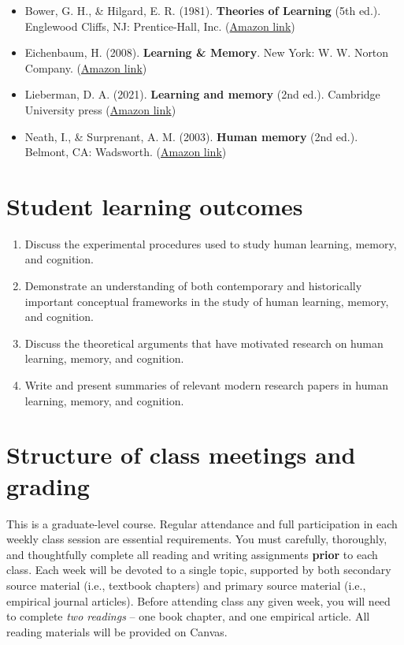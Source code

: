 \documentclass[10pt]{article}
\begin{document}
\begin{itemize}
\item Bower, G. H., \& Hilgard, E. R. (1981). \textbf{Theories of Learning} (5th ed.). Englewood Cliffs, NJ: Prentice-Hall, Inc. (\href{https://www.amazon.com/Theories-Learning-5th-Gordon-Bower/dp/0139144323}{Amazon link})
\item Eichenbaum, H. (2008). \textbf{Learning \& Memory}. New York: W. W. Norton Company. (\href{https://www.amazon.com/Learning-Memory-Howard-Eichenbaum/dp/0393924475}{Amazon link})
\item Lieberman, D. A. (2021). \textbf{Learning and memory} (2nd ed.). Cambridge University press (\href{https://www.amazon.com/Learning-Memory-David-Lieberman/dp/1108428614/}{Amazon link})
\item Neath, I., \& Surprenant, A. M. (2003). \textbf{Human memory} (2nd ed.). Belmont, CA: Wadsworth. (\href{https://www.amazon.com/Human-Memory-second-Neath-Surprenant/dp/B00BUWB592/}{Amazon link})
\end{itemize}

\section*{Student learning outcomes}
\label{sec:orgee0e044}

\begin{enumerate}
\item Discuss the experimental procedures used to study human learning, memory, and cognition.
\item Demonstrate an understanding of both contemporary and historically important conceptual frameworks in the study of human learning, memory, and cognition.
\item Discuss the theoretical arguments that have motivated research on human learning, memory, and cognition.
\item Write and present summaries of relevant modern research papers in human learning, memory, and cognition.
\end{enumerate}

\section*{Structure of class meetings and grading}
\label{sec:org04aee2c}

This is a graduate-level course. Regular attendance and full participation in each weekly class session are essential requirements. You must carefully, thoroughly, and thoughtfully complete all reading and writing assignments \textbf{prior} to each class.  
Each week will be devoted to a single topic, supported by both secondary source material (i.e., textbook chapters) and primary source material (i.e., empirical journal articles). Before attending class any given week, you will need to complete \emph{two readings} -- one book chapter, and one empirical article.  All reading materials will be provided on Canvas.
\end{document}
